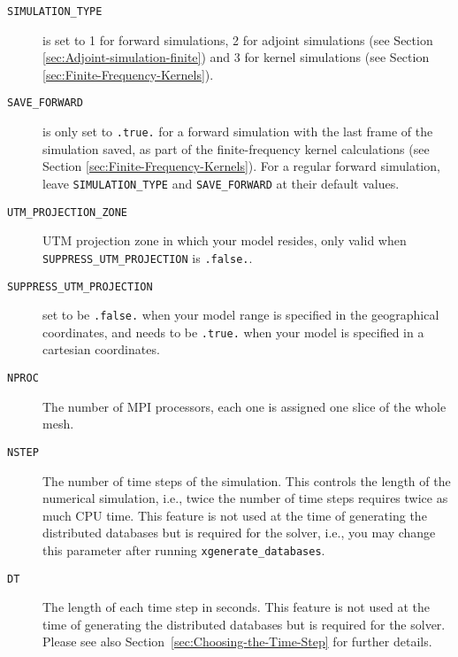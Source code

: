 \begin{description}
\item [{\texttt{SIMULATION\_TYPE}}] is set to 1 for forward simulations,
2 for adjoint simulations (see Section \ref{sec:Adjoint-simulation-finite})
and 3 for kernel simulations (see Section \ref{sec:Finite-Frequency-Kernels}).
\item [{\texttt{SAVE\_FORWARD}}] is only set to \texttt{.true.} for a forward
simulation with the last frame of the simulation saved, as part of
the finite-frequency kernel calculations (see Section \ref{sec:Finite-Frequency-Kernels}).
For a regular forward simulation, leave \texttt{SIMULATION\_TYPE}
and \texttt{SAVE\_FORWARD} at their default values.
\item [{\texttt{UTM\_PROJECTION\_ZONE}}] UTM projection zone in
which your model resides, only valid when \texttt{SUPPRESS\_UTM\_PROJECTION} is \texttt{.false.}.
\item [{\texttt{SUPPRESS\_UTM\_PROJECTION}}] set to be \texttt{.false.}
when your model range is specified in the geographical coordinates,
and needs to be \texttt{.true.} when your model is specified in a
cartesian coordinates. 
\item [{\texttt{NPROC}}] The number of MPI processors, each one is assigned
one slice of the whole mesh.
\item [{\texttt{NSTEP}}] The number of time steps of the simulation. This
controls the length of the numerical simulation, i.e., twice the number
of time steps requires twice as much CPU time. This feature is not
used at the time of generating the distributed databases but is required
for the solver, i.e., you may change this parameter after running
\texttt{xgenerate\_databases}.
\item [{\texttt{DT}}] The length of each time step in seconds. This feature
is not used at the time of generating the distributed databases but
is required for the solver. Please see also Section~\ref{sec:Choosing-the-Time-Step}
for further details.
\end{description}

